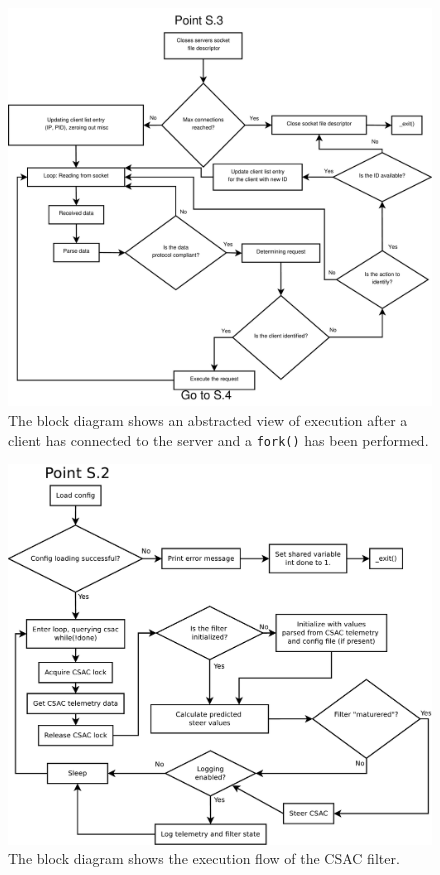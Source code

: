 \documentclass[12pt,english,a4paper]{report}
\begin{document}
\begin{figure}\label{server_flow}
\centering
  \includegraphics[angle=90, scale=0.3]{server_flow.pdf}
   \caption[Socket Server execution flow block diagram]{The block diagram shows an abstracted view of execution after a client has connected to the server and a \texttt{fork()} has been performed.}
\end{figure}

\begin{figure}\label{csac_filter}
\centering
  \includegraphics[angle=90, scale=0.40]{csac_filter.pdf}
   \caption[Socket Server execution flow block diagram]{The block diagram shows the execution flow of the CSAC filter.}
\end{figure}
\end{document}

